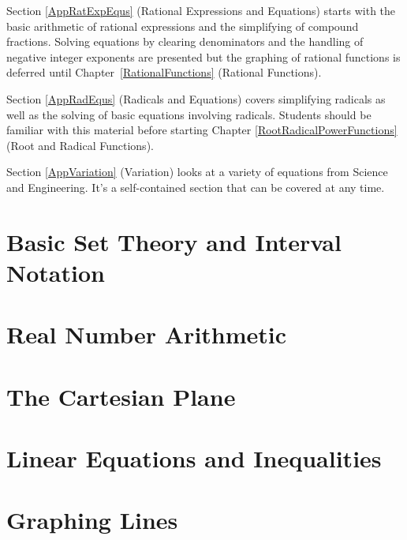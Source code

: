 \medskip

Section \ref{AppRatExpEqus} (Rational Expressions and Equations) starts with the basic arithmetic of rational expressions and the simplifying of compound fractions.  Solving equations by clearing denominators and the handling of negative integer exponents are presented but the graphing of rational functions is deferred until Chapter~\ref{RationalFunctions}  (Rational Functions).

\medskip

Section \ref{AppRadEqus} (Radicals and Equations) covers simplifying radicals as well as the solving of basic equations involving radicals.  Students should be familiar with this material before starting Chapter \ref{RootRadicalPowerFunctions} (Root and Radical Functions).

\medskip

Section \ref{AppVariation} (Variation) looks at a variety of equations from Science and Engineering.  It's a self-contained section that can be covered at any time.

\newpage

\section{Basic Set Theory and Interval Notation}



\newpage

\section{Real Number Arithmetic}



\newpage

\section{The Cartesian Plane}



\newpage

\section{Linear Equations and Inequalities}



\newpage

\section{Graphing Lines}

